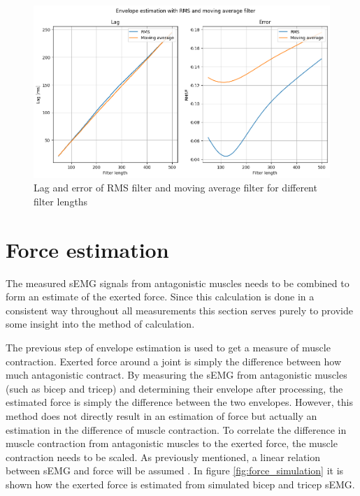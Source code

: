\begin{figure}[h!t]
	\begin{center}
		\includegraphics[width=1.0\columnwidth]{images/lagerror_rms_and_MA_filter.png}
	\end{center}
	\caption{Lag and error of RMS filter and moving average filter for different filter lengths}
	\label{fig:lagerror_RMS_MA}
\end{figure}

\section{Force estimation}\label{section:force_estimation}

The measured sEMG signals from antagonistic muscles needs to be combined to form an estimate of the exerted force. Since this calculation is done in a consistent way throughout all measurements this section serves purely to provide some insight into the method of calculation.

The previous step of envelope estimation is used to get a measure of muscle contraction. Exerted force around a joint is simply the difference between how much antagonistic contract. By measuring the sEMG from antagonistic muscles (such as bicep and tricep) and determining their envelope after processing, the estimated force is simply the difference between the two envelopes. However, this method does not directly result in an estimation of force but actually an estimation in the difference of muscle contraction. To correlate the difference in muscle contraction from antagonistic muscles to the exerted force, the muscle contraction needs to be scaled. As previously mentioned, a linear relation between sEMG and force will be assumed \cite{adaptive_filter_dry_electrode} \cite{interpreting_muscle_function_from_emg}. In figure \ref{fig:force_simulation} it is shown how the exerted force is estimated from simulated bicep and tricep sEMG. 

